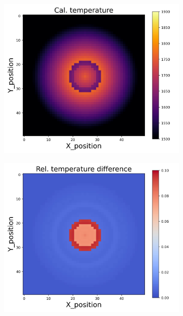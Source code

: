 \begin{figure}[htbp]
\begin{minipage}{\textwidth}
\begin{subfigure}{0.325\textwidth}
        \end{subfigure}
    \end{minipage}\\
    \begin{minipage}{\textwidth}
        \centering
        \begin{subfigure}{0.325\textwidth}
            \centering
            \includegraphics[width=\textwidth]{figures/raw_data/5/mix/T_cal.jpg}
        \end{subfigure}
        \begin{subfigure}{0.325\textwidth}
            \centering
            \includegraphics[width=\textwidth]{figures/raw_data/5/mix/T_bias.jpg}

\end{subfigure}
\end{minipage}
\end{figure}
